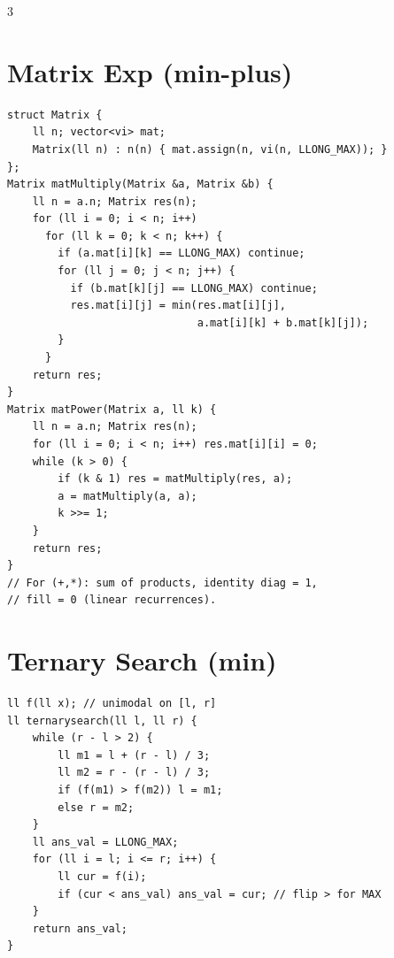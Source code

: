 \documentclass[10pt]{article}
\begin{document}
\begin{multicols*}{3}
\section{Matrix Exp (min-plus)}
\begin{lstlisting}
struct Matrix {
    ll n; vector<vi> mat;
    Matrix(ll n) : n(n) { mat.assign(n, vi(n, LLONG_MAX)); }
};
Matrix matMultiply(Matrix &a, Matrix &b) {
    ll n = a.n; Matrix res(n);
    for (ll i = 0; i < n; i++)
      for (ll k = 0; k < n; k++) {
        if (a.mat[i][k] == LLONG_MAX) continue;
        for (ll j = 0; j < n; j++) {
          if (b.mat[k][j] == LLONG_MAX) continue;
          res.mat[i][j] = min(res.mat[i][j],
                              a.mat[i][k] + b.mat[k][j]);
        }
      }
    return res;
}
Matrix matPower(Matrix a, ll k) {
    ll n = a.n; Matrix res(n);
    for (ll i = 0; i < n; i++) res.mat[i][i] = 0;
    while (k > 0) {
        if (k & 1) res = matMultiply(res, a);
        a = matMultiply(a, a);
        k >>= 1;
    }
    return res;
}
// For (+,*): sum of products, identity diag = 1,
// fill = 0 (linear recurrences).
\end{lstlisting}

\section{Ternary Search (min)}
\begin{lstlisting}
ll f(ll x); // unimodal on [l, r]
ll ternarysearch(ll l, ll r) {
    while (r - l > 2) {
        ll m1 = l + (r - l) / 3;
        ll m2 = r - (r - l) / 3;
        if (f(m1) > f(m2)) l = m1;
        else r = m2;
    }
    ll ans_val = LLONG_MAX;
    for (ll i = l; i <= r; i++) {
        ll cur = f(i);
        if (cur < ans_val) ans_val = cur; // flip > for MAX
    }
    return ans_val;
}
\end{lstlisting}


\end{multicols*}
\end{document}
